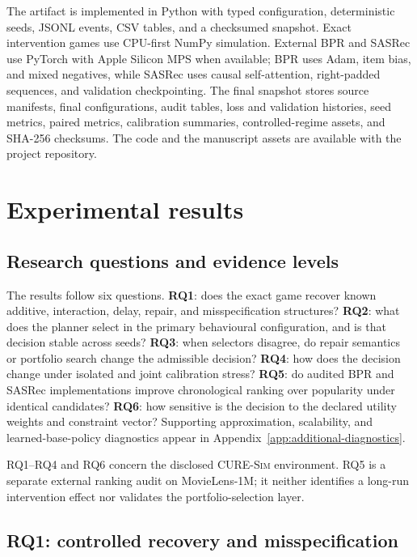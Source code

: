 \documentclass[review]{elsarticle}
\theoremstyle{plain}
\theoremstyle{definition}
\theoremstyle{remark}
\newcommand{\Sim}{\textsc{CURE-Sim}}
\begin{document}
The artifact is implemented in Python with typed configuration, deterministic seeds, JSONL events, CSV tables, and a checksumed snapshot. Exact intervention games use CPU-first NumPy simulation. External BPR and SASRec use PyTorch with Apple Silicon MPS when available; BPR uses Adam, item bias, and mixed negatives, while SASRec uses causal self-attention, right-padded sequences, and validation checkpointing. The final snapshot stores source manifests, final configurations, audit tables, loss and validation histories, seed metrics, paired metrics, calibration summaries, controlled-regime assets, and SHA-256 checksums. The code and the manuscript assets are available with the project repository.

\section{Experimental results}\label{sec:results}

\subsection{Research questions and evidence levels}

The results follow six questions. \textbf{RQ1}: does the exact game recover known additive, interaction, delay, repair, and misspecification structures? \textbf{RQ2}: what does the planner select in the primary behavioural configuration, and is that decision stable across seeds? \textbf{RQ3}: when selectors disagree, do repair semantics or portfolio search change the admissible decision? \textbf{RQ4}: how does the decision change under isolated and joint calibration stress? \textbf{RQ5}: do audited BPR and SASRec implementations improve chronological ranking over popularity under identical candidates? \textbf{RQ6}: how sensitive is the decision to the declared utility weights and constraint vector? Supporting approximation, scalability, and learned-base-policy diagnostics appear in Appendix~\ref{app:additional-diagnostics}.

RQ1--RQ4 and RQ6 concern the disclosed \Sim{} environment. RQ5 is a separate external ranking audit on MovieLens-1M; it neither identifies a long-run intervention effect nor validates the portfolio-selection layer.

\subsection{RQ1: controlled recovery and misspecification}\label{sec:rq1}
\end{document}
